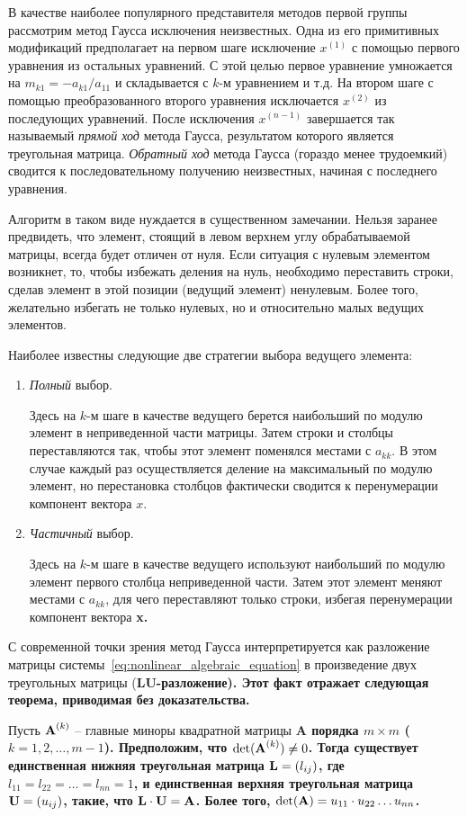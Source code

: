 В качестве наиболее популярного представителя методов первой группы рассмотрим метод Гаусса исключения неизвестных.
Одна из его примитивных модификаций предполагает на первом шаге исключение $\displaystyle x^{(1)}$ с помощью первого
уравнения из остальных уравнений. С этой целью первое уравнение умножается на $m_{k1} = -a_{k1}/a_{11}$ и
складывается с $k$-м уравнением и т.д. На втором шаге с помощью преобразованного второго уравнения исключается
$\displaystyle x^{(2)}$ из последующих уравнений. После исключения $\displaystyle x^{(n-1)}$ завершается так
называемый \emph{прямой ход} метода Гаусса, результатом которого является треугольная матрица. \emph{Обратный ход}
метода Гаусса (гораздо менее трудоемкий) сводится к последовательному получению неизвестных, начиная с последнего
уравнения.

Алгоритм в таком виде нуждается в существенном замечании. Нельзя заранее предвидеть, что элемент, стоящий в левом
верхнем углу обрабатываемой матрицы, всегда будет отличен от нуля. Если ситуация с нулевым элементом возникнет, то,
чтобы избежать деления на нуль, необходимо переставить строки, сделав элемент в этой позиции (ведущий элемент)
ненулевым. Более того, желательно избегать не только нулевых, но и относительно малых ведущих элементов.

Наиболее известны следующие две стратегии выбора ведущего элемента:
\begin{enumerate}
    \item \emph{Полный} выбор.

    Здесь на $k$-м шаге в качестве ведущего берется наибольший по модулю элемент в неприведенной части матрицы.
    Затем строки и столбцы переставляются так, чтобы этот элемент поменялся местами с $a_{kk}$. В этом случае
    каждый раз осуществляется деление на максимальный по модулю элемент, но перестановка столбцов фактически
    сводится к перенумерации компонент вектора $x$.

    \item \emph{Частичный} выбор.

    Здесь на $k$-м шаге в качестве ведущего используют наибольший по модулю элемент первого столбца неприведенной
    части. Затем этот элемент меняют местами с $a_{kk}$, для чего переставляют только строки, избегая перенумерации
    компонент вектора \bf{x}.
\end{enumerate}

С современной точки зрения метод Гаусса интерпретируется как разложение матрицы системы~\eqref{eq:nonlinear_algebraic_equation}
в произведение двух треугольных матрицы (\bf{LU}-разложение). Этот факт отражает следующая теорема, приводимая без
доказательства.
\begin{theorem}
    Пусть $\displaystyle \bf{A}^{(k)}$ -- главные миноры квадратной матрицы \bf{A} порядка $m \times m$ ($k=1,2,\dots,m-1$).
    Предположим, что $\det(\bf{A}^{(k)}) \neq 0$. Тогда существует единственная нижняя треугольная матрица
    $\bf{L} = (l_{ij})$, где $l_{11} = l_{22} = \dots = l_{nn} = 1$, и единственная верхняя треугольная матрица
    $\bf{U} = (u_{ij})$, такие, что $\bf{L} \cdot \bf{U} = \bf{A}$. Более того, $\det(\bf{A}) = u_{11} \cdot u_{22} \dots u_{nn}$.
\end{theorem}

